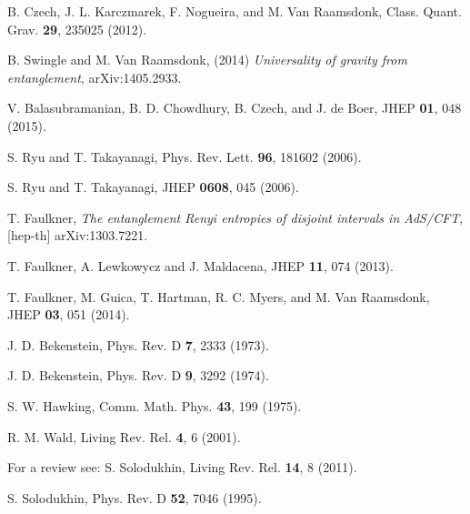 \documentclass[aps,showpacs,showkeys]{revtex4}
\begin{document}
\begin{thebibliography}{0}
B. Czech, J. L. Karczmarek, F. Nogueira, and M. Van Raamsdonk, 
Class. Quant. Grav. {\bf 29}, 235025 (2012).

B. Swingle and M. Van Raamsdonk, (2014) 
{\it Universality of gravity from entanglement},
arXiv:1405.2933.

V. Balasubramanian, B. D. Chowdhury, B. Czech, and J. de Boer, JHEP {\bf 01}, 048 (2015).

S. Ryu and T. Takayanagi, Phys. Rev. Lett. {\bf 96}, 181602 (2006).

S. Ryu and T. Takayanagi, JHEP {\bf 0608}, 045 (2006).

T. Faulkner, 
{\it The entanglement Renyi entropies of disjoint intervals in AdS/CFT},
[hep-th] arXiv:1303.7221.

T. Faulkner, A. Lewkowycz and J. Maldacena, JHEP {\bf 11}, 074 (2013).

T. Faulkner, M. Guica, T. Hartman, R. C. Myers, and M. Van Raamsdonk,
JHEP {\bf 03}, 051 (2014).

J. D. Bekenstein, Phys. Rev. D {\bf 7}, 2333 (1973).

J. D. Bekenstein, Phys. Rev. D {\bf 9}, 3292 (1974).

S. W. Hawking, Comm. Math. Phys. {\bf 43}, 199 (1975). 

R. M. Wald, Living Rev. Rel. {\bf 4}, 6 (2001).

For a review see: 
S. Solodukhin, Living Rev. Rel. {\bf 14}, 8 (2011).

S. Solodukhin, Phys. Rev. D {\bf 52}, 7046 (1995).


\end{thebibliography}
\end{document}
